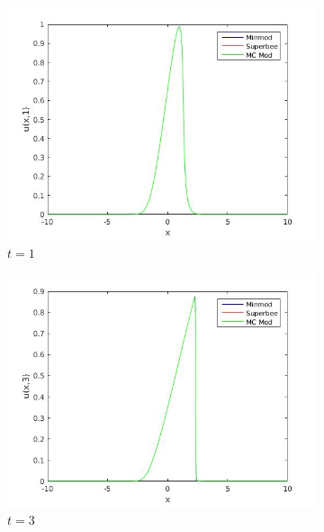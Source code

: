 \begin{figure}[H]
\centering
\begin{subfigure}[b]{0.45\textwidth}
  \includegraphics[width=\textwidth]{Images/8_msm_1.jpg}
  \caption{$t=1$}
\end{subfigure}
\begin{subfigure}[b]{0.45\textwidth}
  \includegraphics[width=\textwidth]{Images/8_msm_2.jpg}
  \caption{$t=3$}
\end{subfigure}
\begin{subfigure}[b]{0.45\textwidth}

\end{subfigure}
\end{figure}
